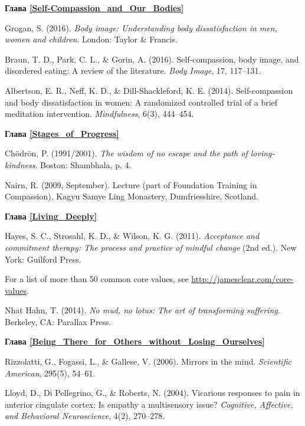 \begin{thebibliography}{999}
	
	\vspace{3ex}
	\textbf{Глава \ref{Self-Compassion_and_Our_Bodies}}
	
	 Grogan, S. (2016). \textit{Body image: Understanding body dissatisfaction in men, women and children}. London: Taylor \& Francis.
	
	 Braun, T. D., Park, C. L., \& Gorin, A. (2016). Self-compassion, body image, and disordered eating: A review of the literature. \textit{Body Image}, 17, 117–131.
	
	 Albertson, E. R., Neff, K. D., \& Dill-Shackleford, K. E. (2014). Self-compassion and body dissatisfaction in women: A randomized controlled trial of a brief meditation intervention. \textit{Mindfulness}, 6(3), 444–454.
	
	
	\vspace{3ex}
	\textbf{Глава \ref{Stages_of_Progress}}
	
	 Ch\"{o}dr\"{o}n, P. (1991/2001). \textit{The wisdom of no escape and the path of loving-kindness}. Boston: Shambhala, p. 4. 
	
	 Nairn, R. (2009, September). Lecture (part of Foundation Training in Compassion), Kagyu Samye Ling Monastery, Dumfriesshire, Scotland.
	
	
	\vspace{3ex}
	\textbf{Глава \ref{Living_Deeply}}
	
	 Hayes, S. C., Strosahl, K. D., \& Wilson, K. G. (2011). \textit{Acceptance and commitment therapy: The process and practice of mindful change} (2nd ed.). New York: Guilford Press.

	 For a list of more than 50 common core values, see \url{http://jamesclear.com/core-values}.

	 Nhat Hahn, T. (2014). \textit{No mud, no lotus: The art of transforming suffering}. Berkeley, CA: Parallax Press.


	\vspace{3ex}
	\textbf{Глава \ref{Being_There_for_Others_without_Losing_Ourselves}}
	
	 Rizzolatti, G., Fogassi, L., \& Gallese, V. (2006). Mirrors in the mind. \textit{Scientific American}, 295(5), 54–61.

	 Lloyd, D., Di Pellegrino, G., \& Roberts, N. (2004). Vicarious responses to pain in anterior cingulate cortex: Is empathy a multisensory issue? \textit{Cognitive, Affective, and Behavioral Neuroscience}, 4(2), 270–278.
	

\end{thebibliography}
